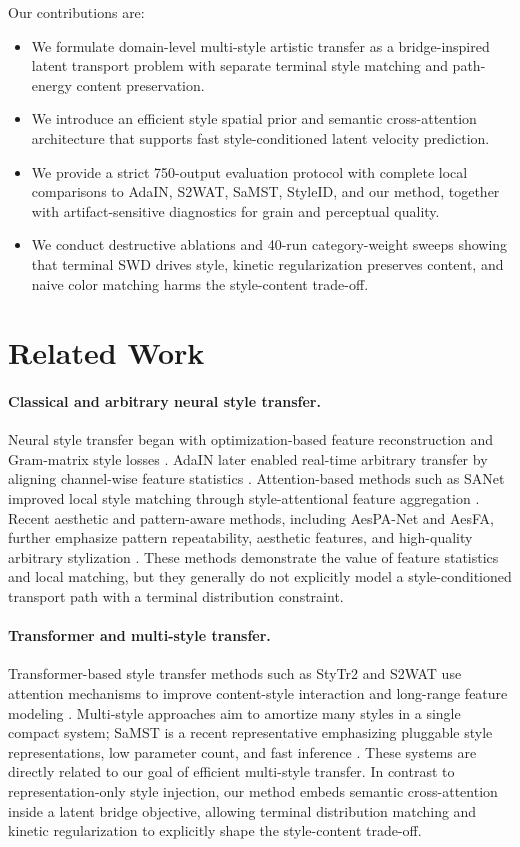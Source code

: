 \documentclass{article}
\begin{document}
Our contributions are:
\begin{itemize}
    \item We formulate domain-level multi-style artistic transfer as a bridge-inspired latent transport problem with separate terminal style matching and path-energy content preservation.
    \item We introduce an efficient style spatial prior and semantic cross-attention architecture that supports fast style-conditioned latent velocity prediction.
    \item We provide a strict 750-output evaluation protocol with complete local comparisons to AdaIN, S2WAT, SaMST, StyleID, and our method, together with artifact-sensitive diagnostics for grain and perceptual quality.
    \item We conduct destructive ablations and 40-run category-weight sweeps showing that terminal SWD drives style, kinetic regularization preserves content, and naive color matching harms the style-content trade-off.
\end{itemize}

\section{Related Work}
\paragraph{Classical and arbitrary neural style transfer.}
Neural style transfer began with optimization-based feature reconstruction and Gram-matrix style losses \cite{gatys2016image}. AdaIN later enabled real-time arbitrary transfer by aligning channel-wise feature statistics \cite{huang2017adain}. Attention-based methods such as SANet improved local style matching through style-attentional feature aggregation \cite{park2019sanet}. Recent aesthetic and pattern-aware methods, including AesPA-Net and AesFA, further emphasize pattern repeatability, aesthetic features, and high-quality arbitrary stylization \cite{hong2023aespa,huang2024aesfa}. These methods demonstrate the value of feature statistics and local matching, but they generally do not explicitly model a style-conditioned transport path with a terminal distribution constraint.

\paragraph{Transformer and multi-style transfer.}
Transformer-based style transfer methods such as StyTr2 and S2WAT use attention mechanisms to improve content-style interaction and long-range feature modeling \cite{deng2022stytr2,xia2024s2wat}. Multi-style approaches aim to amortize many styles in a single compact system; SaMST is a recent representative emphasizing pluggable style representations, low parameter count, and fast inference \cite{liu2024samst}. These systems are directly related to our goal of efficient multi-style transfer. In contrast to representation-only style injection, our method embeds semantic cross-attention inside a latent bridge objective, allowing terminal distribution matching and kinetic regularization to explicitly shape the style-content trade-off.
\end{document}
